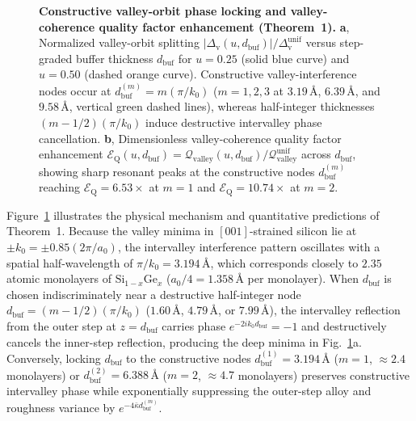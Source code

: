 \documentclass[11pt,letterpaper]{article}
\theoremstyle{definition}
\begin{document}
\begin{figure}[t!]
  \centering
  
  \caption{\textbf{Constructive valley-orbit phase locking and valley-coherence quality factor enhancement (Theorem~1).} \textbf{a}, Normalized valley-orbit splitting $|\Delta_{\mathrm{v}}(u, d_{\mathrm{buf}})|/\Delta_{\mathrm{v}}^{\mathrm{unif}}$ versus step-graded buffer thickness $d_{\mathrm{buf}}$ for $u = 0.25$ (solid blue curve) and $u = 0.50$ (dashed orange curve). Constructive valley-interference nodes occur at $d_{\mathrm{buf}}^{(m)} = m(\pi/k_0)$ ($m=1,2,3$ at $3.19\,\text{\AA}$, $6.39\,\text{\AA}$, and $9.58\,\text{\AA}$, vertical green dashed lines), whereas half-integer thicknesses $(m - 1/2)(\pi/k_0)$ induce destructive intervalley phase cancellation. \textbf{b}, Dimensionless valley-coherence quality factor enhancement $\mathcal{E}_{\mathrm{Q}}(u, d_{\mathrm{buf}}) = \mathcal{Q}_{\mathrm{valley}}(u, d_{\mathrm{buf}})/\mathcal{Q}_{\mathrm{valley}}^{\mathrm{unif}}$ across $d_{\mathrm{buf}}$, showing sharp resonant peaks at the constructive nodes $d_{\mathrm{buf}}^{(m)}$ reaching $\mathcal{E}_{\mathrm{Q}} = 6.53\times$ at $m=1$ and $\mathcal{E}_{\mathrm{Q}} = 10.74\times$ at $m=2$.}
  \label{fig:valley_phase_locking}
\end{figure}

Figure~\ref{fig:valley_phase_locking} illustrates the physical mechanism and quantitative predictions of Theorem~1. Because the valley minima in $[001]$-strained silicon lie at $\pm k_0 = \pm 0.85(2\pi/a_0)$, the intervalley interference pattern oscillates with a spatial half-wavelength of $\pi/k_0 = 3.194\,\text{\AA}$, which corresponds closely to $2.35$ atomic monolayers of $\mathrm{Si}_{1-x}\mathrm{Ge}_x$ ($a_0/4 = 1.358\,\text{\AA}$ per monolayer). When $d_{\mathrm{buf}}$ is chosen indiscriminately near a destructive half-integer node $d_{\mathrm{buf}} = (m - 1/2)(\pi/k_0)$ ($1.60\,\text{\AA}$, $4.79\,\text{\AA}$, or $7.99\,\text{\AA}$), the intervalley reflection from the outer step at $z = d_{\mathrm{buf}}$ carries phase $e^{-2i k_0 d_{\mathrm{buf}}} = -1$ and destructively cancels the inner-step reflection, producing the deep minima in Fig.~\ref{fig:valley_phase_locking}a. Conversely, locking $d_{\mathrm{buf}}$ to the constructive nodes $d_{\mathrm{buf}}^{(1)} = 3.194\,\text{\AA}$ ($m=1$, $\approx 2.4$ monolayers) or $d_{\mathrm{buf}}^{(2)} = 6.388\,\text{\AA}$ ($m=2$, $\approx 4.7$ monolayers) preserves constructive intervalley phase while exponentially suppressing the outer-step alloy and roughness variance by $e^{-4\bar{\kappa} d_{\mathrm{buf}}^{(m)}}$.
\end{document}
